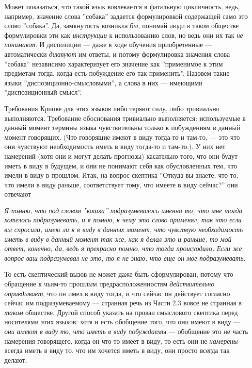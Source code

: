 \documentclass[11pt]{book}
\begin{document}
Может показаться, что такой язык вовлекается в фатальную цикличность, ведь, например, значение слова ''собака'' задается формулировкой содержащей само это слово ''собака''. Да, замкнутость возникла \textit{бы}, понимай люди в таком обществе формулировки эти как \textit{инструкции} к использованию слов, но ведь они их так \textit{не понимают}. И диспозиции --- даже в ходе обучения приобретенные --- автоматически \textit{диктуют} им ответы, и потому формулировка значения слова ''собака'' независимо характеризует его значение как ''применимое к этим предметам тогда, когда есть побуждение его так применить''. Назовем такие языки ''диспозиционно-смысловыми'', а слова в них --- имеющими ''диспозиционный смысл''.

Требования Крипке для этих языков либо теряют силу, либо тривиально выполняются. Требование обоснования тривиально выполняется: используемые в данный момент термины языка чувствительны только к побуждениям в данный момент говорящих. (Что говорящие имеют в виду тогда-то и там-то, --- это что они чувствуют необходимость иметь в виду тогда-то и там-то.). У них нет намерений (хотя они и могут делать прогнозы) касательно того, что они будут иметь в виду в будущем, и они не понимают себя как обусловленных тем, что имели в виду в прошлом. Итак, на вопрос скептика ''Откуда вы знаете, что то, что имели в виду раньше, соответствует тому, что имеете в виду сейчас?'' они отвечают

\smallskip

\textit{Я помню, что под словом ''кошка'' подразумевалось именно то, что мне тогда хотелось подразумевать, и я помню, к чему это слово применял, так что если вы спросили, имею ли я в виду в данных момент, что чувствую необходимость иметь в виду в данный момент так же, как я делал это и раньше, то мой ответ, конечно, да, ведь я прекрасно помню, что тогда происходило. Если же вопрос ваш подразумевал не это, то я не знаю, что еще он мог подразумевать.}

\smallskip

То есть скептический вызов не может даже быть сформулирован, потому что обращение к чьим-то прошлым предрасположенностям \textit{действительно оправдывает}, что он имел в виду тогда, и что сейчас он действует согласно сейчас им подразумеваемому --- странная речь из Части 2.3 вовсе не странная в \textit{таком} обществе. Другой способ указать на провал смыслового скептика перед носителями этих языков: хотя и есть обобщение того, что они имеют в виду --- \textit{они имеют в виду то, что иметь в виду побуждаемы} --- обобщение это не часть намерения говорящего, когда он что-то имеет в виду, то есть они не \textit{намерены} всегда иметь в виду то, что им хочется иметь в виду, они просто всегда так делают.
\end{document}
